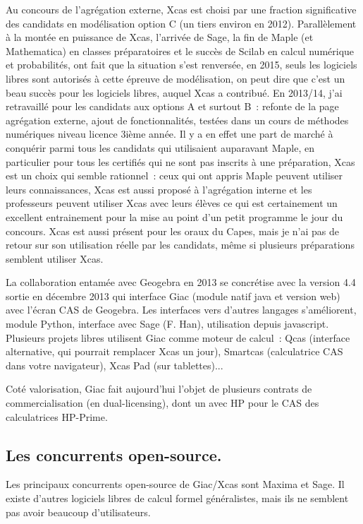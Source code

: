 \documentclass[a4paper,11pt]{article}
\begin{document}
\begin{giacjshere}
Au concours de l'agr\'egation externe,
Xcas est choisi par une fraction
significative des candidats en mod\'elisation option C
(un tiers environ en 2012).
Parall\`element \`a la mont\'ee en
puissance de Xcas, l'arriv\'ee de Sage, la fin de Maple (et
Mathematica) en classes pr\'eparatoires
et le succ\`es de Scilab en calcul num\'erique et probabilit\'es, ont
fait que la situation s'est renvers\'ee, en 2015,
seuls les logiciels libres sont autoris\'es
\`a cette \'epreuve de mod\'elisation, on peut
dire que c'est un beau succ\`es pour les logiciels libres,
auquel Xcas a contribu\'e.
En 2013/14, j'ai retravaill\'e pour les candidats
aux options A et surtout B~: refonte de
la page agr\'egation externe, ajout de fonctionnalit\'es,
test\'ees dans un cours de m\'ethodes num\'eriques
niveau licence 3i\`eme ann\'ee. Il y a en effet une part de march\'e
\`a conqu\'erir parmi tous les candidats qui utilisaient auparavant
Maple, en particulier pour tous les certifi\'es qui
ne sont pas inscrits \`a une pr\'eparation, Xcas est un choix
qui semble rationnel~: ceux qui ont appris Maple peuvent
utiliser leurs connaissances, Xcas est aussi propos\'e
\`a l'agr\'egation interne et les professeurs peuvent utiliser Xcas avec
leurs \'el\`eves ce qui est certainement un excellent entrainement
pour la mise au point d'un petit programme le jour du concours.
Xcas est aussi pr\'esent pour les oraux du Capes, mais je n'ai
pas de retour sur son utilisation r\'eelle par les candidats,
m\^eme si plusieurs pr\'eparations semblent utiliser Xcas.

La collaboration entam\'ee avec Geogebra en 2013
se concr\'etise avec la version 4.4 sortie en d\'ecembre 2013
qui interface Giac (module natif java et version
web) avec l'\'ecran CAS de Geogebra.
Les interfaces vers d'autres langages s'am\'eliorent,
module Python, interface avec Sage (F. Han),
utilisation depuis javascript. Plusieurs projets
libres utilisent Giac comme moteur de calcul~: Qcas (interface
alternative, qui pourrait remplacer Xcas un jour),
Smartcas (calculatrice CAS dans votre navigateur),
Xcas Pad (sur tablettes)...

Cot\'e valorisation, Giac fait aujourd'hui l'objet de
plusieurs contrats de
commercialisation (en dual-licensing), dont un avec HP
pour le CAS des calculatrices HP-Prime.

\subsection{Les concurrents open-source.} \label{sec:concurrents}
Les principaux concurrents open-source de Giac/Xcas sont Maxima et
Sage. Il existe d'autres logiciels libres de calcul formel 
g\'en\'eralistes, mais ils
ne semblent pas avoir beaucoup d'utilisateurs.


\end{giacjshere}
\end{document}
